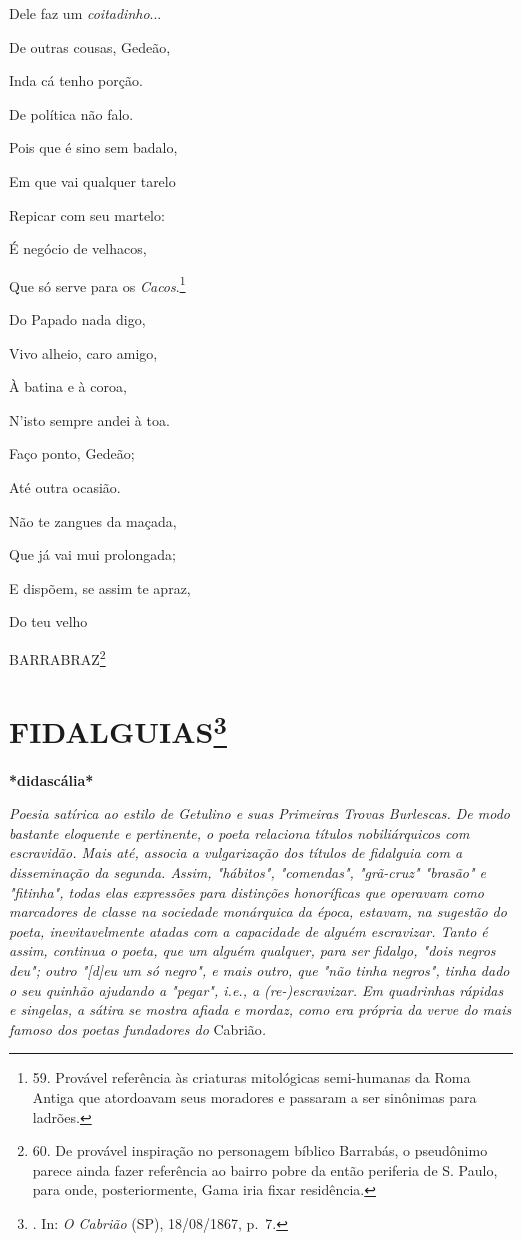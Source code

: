 Dele faz um \emph{coitadinho}...

De outras cousas, Gedeão,

Inda cá tenho porção.

De política não falo.

Pois que é sino sem badalo,

Em que vai qualquer tarelo

Repicar com seu martelo:

É negócio de velhacos,

Que só serve para os \emph{Cacos}.\footnote{59. Provável referência às
  criaturas mitológicas semi-humanas da Roma Antiga que atordoavam seus
  moradores e passaram a ser sinônimas para ladrões.}

Do Papado nada digo,

Vivo alheio, caro amigo,

À batina e à coroa,

N'isto sempre andei à toa.

Faço ponto, Gedeão;

Até outra ocasião.

Não te zangues da maçada,

Que já vai mui prolongada;

E dispõem, se assim te apraz,

Do teu velho

BARRABRAZ\footnote{60. De provável inspiração no personagem bíblico
  Barrabás, o pseudônimo parece ainda fazer referência ao bairro pobre
  da então periferia de S. Paulo, para onde, posteriormente, Gama iria
  fixar residência.}

\chapter[\textbf{FIDALGUIAS}]{\texorpdfstring{\textbf{FIDALGUIAS}\footnote{.
  In: \emph{O Cabrião} (SP), 18/08/1867, p.~7.}}{FIDALGUIAS}}

\textbf{*didascália*}

\emph{Poesia satírica ao estilo de Getulino e suas Primeiras Trovas
Burlescas. De modo bastante eloquente e pertinente, o poeta relaciona
títulos nobiliárquicos com escravidão. Mais até, associa a vulgarização
dos títulos de fidalguia com a disseminação da segunda. Assim,
"hábitos", "comendas", "grã-cruz" "brasão" e "fitinha", todas elas
expressões para distinções honoríficas que operavam como marcadores de
classe na sociedade monárquica da época, estavam, na sugestão do poeta,
inevitavelmente atadas com a capacidade de alguém escravizar. Tanto é
assim, continua o poeta, que um alguém qualquer, para ser fidalgo, "dois
negros deu"; outro "{[}d{]}eu um só negro", e mais outro, que "não tinha
negros", tinha dado o seu quinhão ajudando a "pegar", i.e., a
(re-)escravizar. Em quadrinhas rápidas e singelas, a sátira se mostra
afiada e mordaz, como era própria da verve do mais famoso dos poetas
fundadores do} Cabrião\emph{.}

